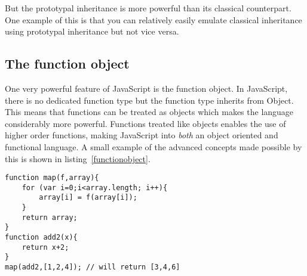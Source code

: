 But the prototypal inheritance is more powerful than its classical counterpart. One example of this is that you can relatively easily emulate classical inheritance using prototypal inheritance but not vice versa\cite{mozilla}.



\subsection{The function object}
One very powerful feature of JavaScript is the function object. In JavaScript, there is no dedicated function type but the function type inherits from Object. This means that functions can be treated as objects which makes the language considerably more powerful. Functions treated like objects enables the use of higher order functions, making JavaScript into \emph{both} an object oriented and functional language. A small example of the advanced concepts made possible by this is shown in listing~\ref{functionobject}.

\begin{lstlisting}[caption=Inheritance,label=inheritance]
function map(f,array){
	for (var i=0;i<array.length; i++){
		array[i] = f(array[i]);
	}
	return array;
}
function add2(x){
	return x+2;
}
map(add2,[1,2,4]); // will return [3,4,6]
\end{lstlisting}	